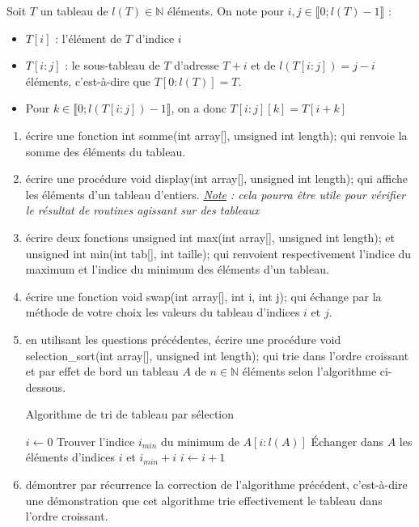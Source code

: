\documentclass[../../../main.tex]{subfiles}
\begin{document}
Soit $T$ un tableau de $l(T)\in\mathbb{N}$ éléments. On note pour $i, j\in{\llbracket 0; l(T)-1}\rrbracket$ :
\begin{itemize}
	\item $T[i]$ : l'élément de $T$ d'indice $i$
	\item $T[i:j]$ : le sous-tableau de $T$ d'adresse $T + i$ et de $l(T[i:j]) = j - i$ éléments, c'est-à-dire que $T[0:l(T)] = T$.
	\item Pour $k\in\llbracket 0; l(T[i:j]) - 1 \rrbracket$, on a donc $T[i:j][k] = T[i + k]$
\end{itemize}
\begin{enumerate}
	\item écrire une fonction \textsf{int somme(int array[], unsigned int length);} qui renvoie la somme des éléments du tableau.
	\item écrire une procédure \textsf{void display(int array[], unsigned int length);} qui affiche les éléments d'un tableau d'entiers.\newline
		\textit{\underline{Note} : cela pourra être utile pour vérifier le résultat de routines agissant sur des tableaux}
 	\item écrire deux fonctions \textsf{unsigned int max(int array[], unsigned int length);} et \textsf{unsigned int min(int tab[], int taille);} qui renvoient respectivement l'indice du maximum et l'indice du minimum des éléments d'un tableau.
	\item écrire une fonction \textsf{void swap(int array[], int i, int j);} qui échange par la méthode de votre choix les valeurs du tableau d'indices $i$ et $j$.
	\item en utilisant les questions précédentes, écrire une procédure \textsf{void selection\_sort(int array[], unsigned int length);} qui trie dans l'ordre croissant et par effet de bord un tableau $A$ de $n\in\mathbb{N}$ éléments selon l'algorithme ci-dessous.
\begin{algorithm}
\caption{Algorithme de tri de tableau par sélection}\label{alg:select_sort}
\;
\;

$i\leftarrow 0$\;
 {
	Trouver l'indice $i_{min}$ du minimum de $A[i:l(A)]$\;
	Échanger dans $A$ les éléments d'indices $i$ et $i_{min} + i$\;
	$i\leftarrow i+1$\;
}
\end{algorithm}
\item démontrer par récurrence la correction de l'algorithme précédent, c'est-à-dire une démonstration que cet algorithme trie effectivement le tableau dans l'ordre croissant.
\end{enumerate}
\end{document}
